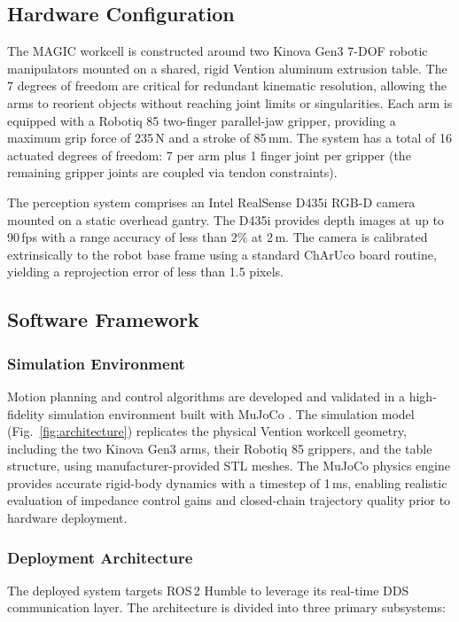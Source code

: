 \documentclass[letterpaper, 10 pt, conference]{ieeeconf}  %
\begin{document}
\subsection{Hardware Configuration}
The MAGIC workcell is constructed around two Kinova Gen3 7-DOF robotic
manipulators mounted on a shared, rigid Vention aluminum extrusion table. The
7 degrees of freedom are critical for redundant kinematic resolution, allowing
the arms to reorient objects without reaching joint limits or singularities.
Each arm is equipped with a Robotiq 85 two-finger parallel-jaw gripper,
providing a maximum grip force of 235\,N and a stroke of 85\,mm. The system
has a total of 16 actuated degrees of freedom: 7 per arm plus 1 finger joint
per gripper (the remaining gripper joints are coupled via tendon constraints).

The perception system comprises an Intel RealSense D435i RGB-D camera mounted
on a static overhead gantry. The D435i provides depth images at up to
90\,fps with a range accuracy of less than 2\% at 2\,m. The camera is
calibrated extrinsically to the robot base frame using a standard ChArUco
board routine, yielding a reprojection error of less than 1.5 pixels.

\subsection{Software Framework}

\subsubsection{Simulation Environment}
Motion planning and control algorithms are developed and validated in a
high-fidelity simulation environment built with MuJoCo \cite{todorov2012mujoco}.
The simulation model (Fig.~\ref{fig:architecture}) replicates the physical
Vention workcell geometry, including the two Kinova Gen3 arms, their Robotiq
85 grippers, and the table structure, using manufacturer-provided STL
meshes. The MuJoCo physics engine provides accurate rigid-body dynamics with
a timestep of 1\,ms, enabling realistic evaluation of impedance control gains
and closed-chain trajectory quality prior to hardware deployment.

\subsubsection{Deployment Architecture}
The deployed system targets ROS\,2 Humble to leverage its real-time DDS
communication layer. The architecture is divided into three primary
subsystems:
\end{document}
